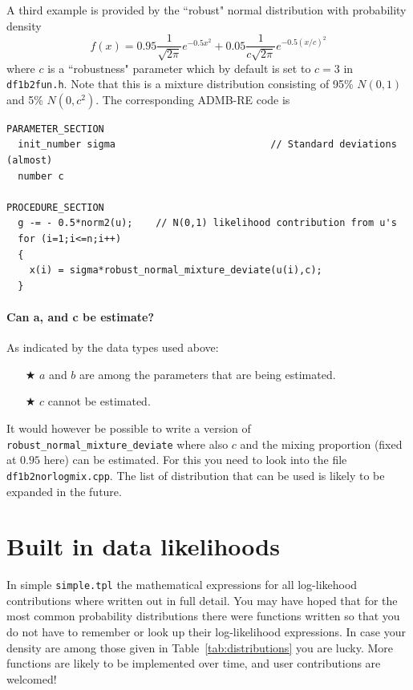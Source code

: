 \documentclass[12pt,letter,reqno]{book}
\begin{document}
A third example is provided by the ``robust" normal distribution with probability density
$$
  f(x) = 0.95\frac{1}{\sqrt{2\pi}}e^{-0.5x^2}
         + 0.05\frac{1}{c\sqrt{2\pi}}e^{-0.5(x/c)^2}
$$
where $c$ is a ``robustness" parameter which by default is set to $c=3$ in \texttt{df1b2fun.h}.
Note that this is a mixture distribution consisting of 95\% $N(0,1)$ and 5\% $N(0,c^2)$.
The corresponding ADMB-RE code is
\begin{lstlisting}
PARAMETER_SECTION
  init_number sigma                           // Standard deviations (almost)
  number c

PROCEDURE_SECTION
  g -= - 0.5*norm2(u);    // N(0,1) likelihood contribution from u's
  for (i=1;i<=n;i++) 
  {
    x(i) = sigma*robust_normal_mixture_deviate(u(i),c);        
  }

\end{lstlisting}

\paragraph{Can a, and c be estimate?}
As indicated by the data types used above:
\begin{itemize}
\item[$\bigstar$] 
    $a$ and $b$ are among the parameters that are being estimated.
\item[$\bigstar$] 
    $c$ cannot be estimated.
\end{itemize}
It would however be possible to write a version of \texttt{robust\_normal\_mixture\_deviate}
where also $c$ and the mixing proportion (fixed at $0.95$ here) can be estimated.
For this you need to look into the file \texttt{df1b2norlogmix.cpp}.
The list of distribution that can be used is likely to be expanded in the future.

\section{Built in data likelihoods}
In simple \texttt{simple.tpl} the mathematical expressions for all log-likehood contributions
where written out in full detail. You may have hoped that for the most common
probability distributions there were functions written so that
you do not have to remember or look up their log-likelihood expressions. In case your
density are among those given in Table~\ref{tab:distributions} you are
lucky. More functions are likely to be implemented over time,
and user contributions are welcomed!
\end{document}
